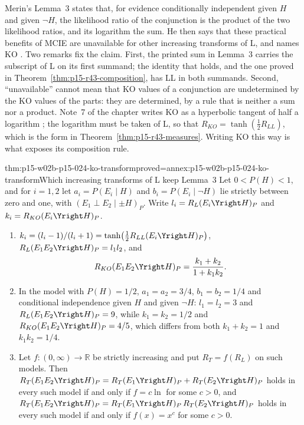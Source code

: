 Merin's Lemma~3 states that, for evidence conditionally independent
given \(H\) and given \(\neg H\), the likelihood ratio of the
conjunction is the product of the two likelihood ratios, and its
logarithm the sum. He then says that these practical benefits of MCIE
are unavailable for other increasing transforms of L, and names KO
\cite[p.~271]{Merin2021Relevance}. Two remarks fix the claim. First,
the printed sum in Lemma~3 carries the subscript of L on its first
summand; the identity that holds, and the one proved in
Theorem~\ref{thm:p15-r43-composition}, has LL in both summands.
Second, ``unavailable'' cannot mean that KO values of a conjunction are
undetermined by the KO values of the parts: they are determined, by a
rule that is neither a sum nor a product. Note~7 of the chapter writes
KO as a hyperbolic tangent of half a logarithm
\cite[p.~274, n.~7]{Merin2021Relevance}; the logarithm must be taken
of L, so that \(R_{KO}=\tanh(\tfrac12 R_{LL})\), which is the form in
Theorem~\ref{thm:p15-r43-measures}. Writing KO this way is what
exposes its composition rule.

\begin{hbtheorem}{thm:p15-w02b-p15-024-ko-transform}{proved=annex:p15-w02b-p15-024-ko-transform}{Which increasing transforms of L keep Lemma~3}
Let \(0<P(H)<1\), and for \(i=1,2\) let \(a_i=P(E_i\mid H)\) and
\(b_i=P(E_i\mid\neg H)\) lie strictly between zero and one, with
\((E_1\perp E_2\mid\pm H)_P\). Write \(l_i=R_L(E_i\Yright H)_P\) and
\(k_i=R_{KO}(E_i\Yright H)_P\).
\begin{enumerate}
\item \(k_i=(l_i-1)/(l_i+1)=\tanh\bigl(\tfrac12R_{LL}(E_i\Yright H)_P\bigr)\),
  \(R_L(E_1E_2\Yright H)_P=l_1l_2\), and
  \[
   R_{KO}(E_1E_2\Yright H)_P=\frac{k_1+k_2}{1+k_1k_2}.
  \]
\item In the model with \(P(H)=1/2\), \(a_1=a_2=3/4\),
  \(b_1=b_2=1/4\) and conditional independence given \(H\) and given
  \(\neg H\): \(l_1=l_2=3\) and \(R_L(E_1E_2\Yright H)_P=9\), while
  \(k_1=k_2=1/2\) and \(R_{KO}(E_1E_2\Yright H)_P=4/5\), which differs
  from both \(k_1+k_2=1\) and \(k_1k_2=1/4\).
\item Let \(f\colon(0,\infty)\to\mathbb{R}\) be strictly increasing and
  put \(R_T=f(R_L)\) on such models. Then
  \(R_T(E_1E_2\Yright H)_P=R_T(E_1\Yright H)_P+R_T(E_2\Yright H)_P\)
  holds in every such model if and only if \(f=c\ln\) for some
  \(c>0\), and
  \(R_T(E_1E_2\Yright H)_P=R_T(E_1\Yright H)_P\,R_T(E_2\Yright H)_P\)
  holds in every such model if and only if \(f(x)=x^c\) for some
  \(c>0\).
\end{enumerate}
\end{hbtheorem}

